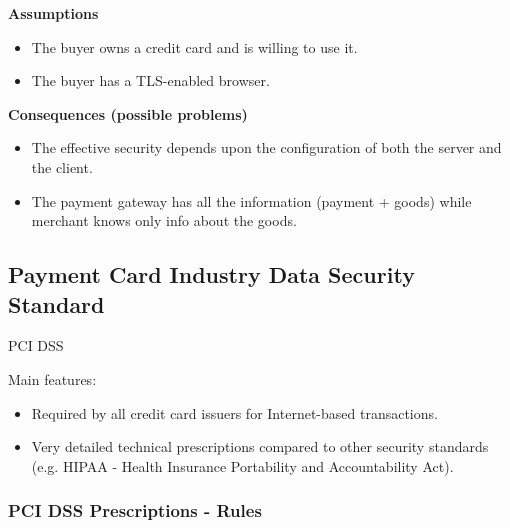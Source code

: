 \begin{center}
    \textbf{Assumptions}
\end{center}

\begin{itemize}
    \item The buyer owns a credit card and is willing to use it.
    \item The buyer has a TLS-enabled browser.
\end{itemize}
\begin{center}
    \textbf{Consequences (possible problems)}
\end{center}
\begin{itemize}
    \item The effective security depends upon the configuration of both the server and the client.
    \item The payment gateway has all the information (payment + goods) while merchant knows only info about the goods.
\end{itemize}

\subsection{Payment Card Industry Data Security Standard}
\begin{center}
    PCI DSS
\end{center}

Main features:
\begin{itemize}
    \item Required by all credit card issuers for Internet-based transactions.
    \item Very detailed technical prescriptions compared to other security standards (e.g. HIPAA - Health Insurance Portability and Accountability Act).
\end{itemize}

\begin{center}
    \subsubsection*{PCI DSS Prescriptions - Rules}
\end{center}


